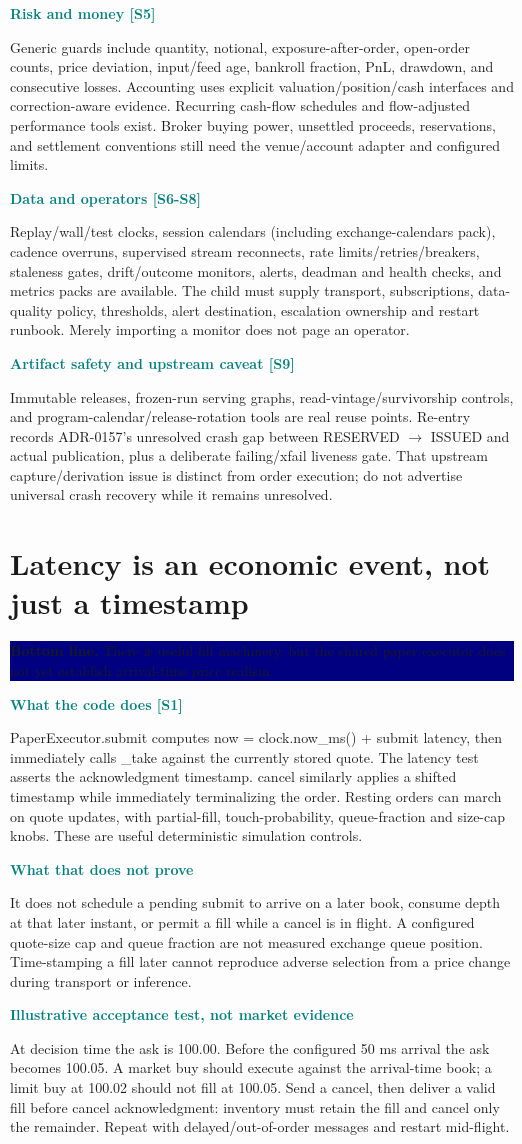 \documentclass[10pt,letterpaper]{article}
\newcommand{\bl}[1]{\noindent\colorbox{navy}{\parbox{\dimexpr\linewidth-2\fboxsep}{\color{white}\textbf{Bottom line.} #1}}\par\medskip}
\newcommand{\topic}[2]{\clearpage\section{#1}\bl{#2}}
\newcommand{\sub}[1]{\par\textbf{\textcolor{teal}{#1}}\par}
\begin{document}
\sub{Risk and money [S5]}
Generic guards include quantity, notional, exposure-after-order, open-order counts, price deviation, input/feed age, bankroll fraction, PnL, drawdown, and consecutive losses. Accounting uses explicit valuation/position/cash interfaces and correction-aware evidence. Recurring cash-flow schedules and flow-adjusted performance tools exist. Broker buying power, unsettled proceeds, reservations, and settlement conventions still need the venue/account adapter and configured limits.
\sub{Data and operators [S6-S8]}
Replay/wall/test clocks, session calendars (including exchange-calendars pack), cadence overruns, supervised stream reconnects, rate limits/retries/breakers, staleness gates, drift/outcome monitors, alerts, deadman and health checks, and metrics packs are available. The child must supply transport, subscriptions, data-quality policy, thresholds, alert destination, escalation ownership and restart runbook. Merely importing a monitor does not page an operator.
\sub{Artifact safety and upstream caveat [S9]}
Immutable releases, frozen-run serving graphs, read-vintage/survivorship controls, and program-calendar/release-rotation tools are real reuse points. Re-entry records ADR-0157's unresolved crash gap between RESERVED $\rightarrow$ ISSUED and actual publication, plus a deliberate failing/xfail liveness gate. That upstream capture/derivation issue is distinct from order execution; do not advertise universal crash recovery while it remains unresolved.
\topic{Latency is an economic event, not just a timestamp}{There is useful fill machinery, but the shared paper executor does not yet establish arrival-time price realism.}
\sub{What the code does [S1]}
PaperExecutor.submit computes now = clock.now\_ms() + submit latency, then immediately calls \_take against the currently stored quote. The latency test asserts the acknowledgment timestamp. cancel similarly applies a shifted timestamp while immediately terminalizing the order. Resting orders can march on quote updates, with partial-fill, touch-probability, queue-fraction and size-cap knobs. These are useful deterministic simulation controls.
\sub{What that does not prove}
It does not schedule a pending submit to arrive on a later book, consume depth at that later instant, or permit a fill while a cancel is in flight. A configured quote-size cap and queue fraction are not measured exchange queue position. Time-stamping a fill later cannot reproduce adverse selection from a price change during transport or inference.
\sub{Illustrative acceptance test, not market evidence}
At decision time the ask is 100.00. Before the configured 50 ms arrival the ask becomes 100.05. A market buy should execute against the arrival-time book; a limit buy at 100.02 should not fill at 100.05. Send a cancel, then deliver a valid fill before cancel acknowledgment: inventory must retain the fill and cancel only the remainder. Repeat with delayed/out-of-order messages and restart mid-flight.
\end{document}

